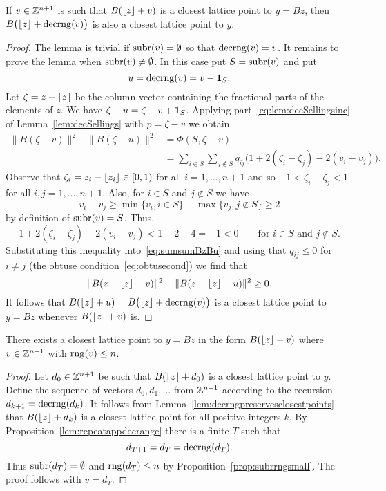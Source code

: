 \documentclass[final,leqno]{siamltex}
\begin{document}
\begin{lemma}\label{lem:decrngpreservesclosestpoints}
If $v \in {\mathbb Z}^{n+1}$ is such that $B({\left\lfloor z \right\rfloor} + v)$ is a closest lattice point to $y = Bz$, then $B\big({\left\lfloor z \right\rfloor} + \operatorname{decrng}(v)\big)$ is also a closest lattice point to $y$.
\end{lemma}
\begin{proof}
The lemma is trivial if $\operatorname{subr}(v) = \emptyset$ so that $\operatorname{decrng}(v) = v$.  It remains to prove the lemma when $\operatorname{subr}(v) \neq \emptyset$.  In this case put $S = \operatorname{subr}(v)$ and put 
\[
u = \operatorname{decrng}(v) = v - \boldsymbol{1}_S.
\] 
Let $\zeta = z - {\left\lfloor z \right\rfloor}$ be the column vector containing the fractional parts of the elements of $z$.  We have $\zeta - u = \zeta - v + \boldsymbol{1}_S$.  Applying part~\ref{eq:lem:decSellingsinc} of Lemma~\ref{lem:decSellings} with $p = \zeta - v$ we obtain
\begin{align}
\|B(\zeta - v)\|^2 - \|B(\zeta - u)\|^2 &= \Phi(S, \zeta-v) \nonumber \\
&= \sum_{i \in S}\sum_{j \notin S}q_{ij}\big(1 + 2(\zeta_i-\zeta_j) - 2(v_i - v_j)\big). \label{eq:sumsumBzBu}
\end{align}
Observe that $\zeta_i =  z_i - {\left\lfloor z_i \right\rfloor} \in [0,1)$ for all $i=1,\dots,n+1$ and so $-1 < \zeta_i-\zeta_j < 1$ for all $i,j=1,\dots,n+1$.  Also, for $i \in S$ and $j\notin S$ we have 
\[
v_i - v_j \geq \min\{ v_i, i \in S\} - \max\{v_j, j \notin S\} \geq 2
\]
by definition of $\operatorname{subr}(v) = S$.  Thus,
\[
1 + 2(\zeta_i-\zeta_j) - 2(v_i - v_j) < 1 + 2 - 4 = -1 < 0 \qquad \text{for $i \in S$ and $j \notin S$}.
\]
Substituting this inequality into~\eqref{eq:sumsumBzBu} and using that $q_{ij} \leq 0$ for $i \neq j$ (the obtuse condition~\eqref{eq:obtusecond}) we find that
\[
\|B(z - {\left\lfloor z \right\rfloor} - v)\|^2 - \|B(z - {\left\lfloor z \right\rfloor} - u)\|^2 \geq 0.
\]
It follows that $B({\left\lfloor z \right\rfloor} + u) = B\big({\left\lfloor z \right\rfloor} + \operatorname{decrng}(v)\big)$ is a closest lattice point to $y = Bz$ whenever $B({\left\lfloor z \right\rfloor} + v)$ is.
\end{proof}

\begin{lemma}\label{lem:roundzclose}
There exists a closest lattice point to $y = Bz$ in the form $B({\left\lfloor z \right\rfloor} + v)$ where $v \in {\mathbb Z}^{n+1}$ with $\operatorname{rng}(v) \leq n$.
\end{lemma}
\begin{proof}
Let $d_0 \in {\mathbb Z}^{n+1}$ be such that $B({\left\lfloor z \right\rfloor} + d_0)$ is a closest lattice point to $y$. Define the sequence of vectors $d_0,d_1,\dots$ from ${\mathbb Z}^{n+1}$ according to the recursion $d_{k+1} = \operatorname{decrng}(d_k)$.  It follows from Lemma~\ref{lem:decrngpreservesclosestpoints} that $B({\left\lfloor z \right\rfloor} + d_{k})$ is a closest lattice point for all positive integers $k$.  By Proposition~\ref{lem:repeatappdecrange} there is a finite $T$ such that 
\[
d_{T+1}=d_T=\operatorname{decrng}(d_T).
\]  
Thus $\operatorname{subr}(d_T) = \emptyset$ and $\operatorname{rng}(d_T) \leq n$ by Proposition~\ref{prop:subrrngsmall}.  The proof follows with $v = d_T$.   
\end{proof}
\end{document}
